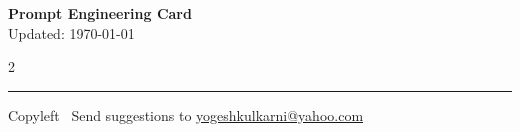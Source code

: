\documentclass[8pt,landscape]{article}
\begin{document}
\begin{center}
     \Large{\textbf{Prompt Engineering Card}}  \\ \small Updated: \today 
\end{center}

\raggedright
\footnotesize
\begin{multicols}{2}





\vspace{2mm}

\rule{0.3\linewidth}{0.25pt}

\scriptsize
Copyleft \textcopyleft\  Send suggestions to 
\href{http://www.yogeshkulkarni.com}{yogeshkulkarni@yahoo.com}

\end{multicols}
\end{document}
